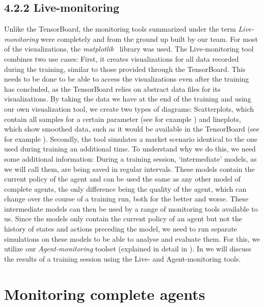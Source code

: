 \subsection*{4.2.2 Live-monitoring}\label{subsec:LiveMonitoring}

Unlike the TensorBoard, the monitoring tools summarized under the term \emph{Live-monitoring} were completely and from the ground up built by our team. For most of the visualizations, the \emph{matplotlib}~\cite{Matplotlib} library was used. The Live-monitoring tool combines two use cases: First, it creates visualizations for all data recorded during the training, similar to those provided through the TensorBoard. This needs to be done to be able to access the visualizations even after the training has concluded, as the TensorBoard relies on abstract data files for its visualizations. By taking the data we have at the end of the training and using our own visualization tool, we create two types of diagrams: Scatterplots, which contain all samples for a certain parameter (see for example ) and lineplots, which show smoothed data, such as it would be available in the TensorBoard (see for example ). Secondly, the tool simulates a market scenario identical to the one used during training an additional time. To understand why we do this, we need some additional information: During a training session, `intermediate' models, as we will call them, are being saved in regular intervals. These models contain the current policy of the agent and can be used the same as any other model of complete agents, the only difference being the quality of the agent, which can change over the course of a training run, both for the better and worse. These intermediate models can then be used by a range of monitoring tools available to us. Since the models only contain the current policy of an agent but not the history of states and actions preceding the model, we need to run separate simulations on these models to be able to analyse and evaluate them. For this, we utilize our \emph{Agent-monitoring} toolset (explained in detail in ). In  we will discuss the results of a training session using the Live- and Agent-monitoring tools.

\section{Monitoring complete agents}\label{sec:CompleteAgents}


